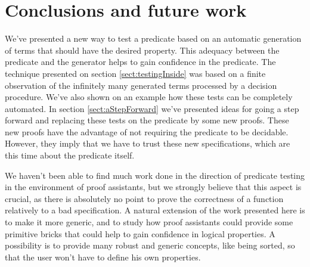 \section{Conclusions and future work}


We've presented a new way to test a predicate based on an automatic generation of terms that should have the desired property. This adequacy between the predicate and the generator helps to gain confidence in the predicate. The technique presented on section \ref{sect:testingInside} was based on a finite observation of the infinitely many generated terms processed by a decision procedure. We've also shown on an example how these tests can be completely automated. In section \ref{sect:aStepForward} we've presented ideas for going a step forward and replacing these tests on the predicate by some new proofs. These new proofs have the advantage of not requiring the predicate to be decidable. However, they imply that we have to trust these new specifications, which are this time about the predicate itself.

We haven't been able to find much work done in the direction of predicate testing in the environment of proof assistants, but we strongly believe that this aspect is crucial, as there is absolutely no point to prove the correctness of a function relatively to a bad specification. A natural extension of the work presented here is to make it more generic, and to study how proof assistants could provide some primitive bricks that could help to gain confidence in logical properties. A possibility is to provide many robust and generic concepts, like being sorted, so that the user won't have to define his own properties. 